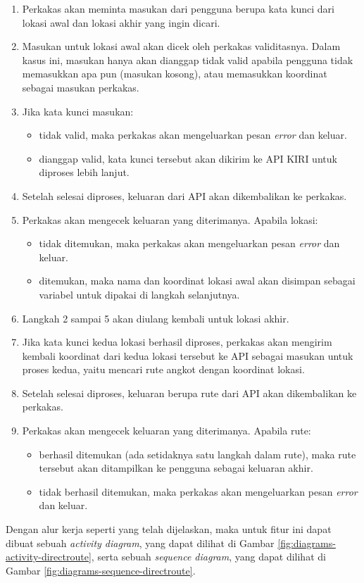 \begin{enumerate}
	\item Perkakas akan meminta masukan dari pengguna berupa kata kunci dari lokasi awal dan lokasi akhir yang ingin dicari.
	\item Masukan untuk lokasi awal akan dicek oleh perkakas validitasnya. Dalam kasus ini, masukan hanya akan dianggap tidak valid apabila pengguna tidak memasukkan apa pun (masukan kosong), atau memasukkan koordinat \latlon\xspace sebagai masukan perkakas.
	\item Jika kata kunci masukan:
	
	\begin{itemize}
		\item tidak valid, maka perkakas akan mengeluarkan pesan \textit{error} dan keluar.
		\item dianggap valid, kata kunci tersebut akan dikirim ke API KIRI untuk diproses lebih lanjut.
	\end{itemize}
	 
	\item Setelah selesai diproses, keluaran dari API akan dikembalikan ke perkakas.
	\item Perkakas akan mengecek keluaran yang diterimanya. Apabila lokasi:
	
	\begin{itemize}
		\item tidak ditemukan, maka perkakas akan mengeluarkan pesan \textit{error} dan keluar.
		\item ditemukan, maka nama dan koordinat \latlon\xspace lokasi awal akan disimpan sebagai variabel untuk dipakai di langkah selanjutnya.
	\end{itemize}
	
	\item Langkah 2 sampai 5 akan diulang kembali untuk lokasi akhir.
	\item Jika kata kunci kedua lokasi berhasil diproses, perkakas akan mengirim kembali koordinat \latlon\xspace dari kedua lokasi tersebut ke API sebagai masukan untuk proses kedua, yaitu mencari rute angkot dengan koordinat \latlon\xspace lokasi.
	\item Setelah selesai diproses, keluaran berupa rute dari API akan dikembalikan ke perkakas.
	\item Perkakas akan mengecek keluaran yang diterimanya. Apabila rute:
	
	\begin{itemize}
		\item berhasil ditemukan (ada setidaknya satu langkah dalam rute), maka rute tersebut akan ditampilkan ke pengguna sebagai keluaran akhir.
		\item tidak berhasil ditemukan, maka perkakas akan mengeluarkan pesan \textit{error} dan keluar.
	\end{itemize}
	
\end{enumerate}
\noindent
Dengan alur kerja seperti yang telah dijelaskan, maka untuk fitur ini dapat dibuat sebuah \textit{activity diagram}, yang dapat dilihat di Gambar \ref{fig:diagrams-activity-directroute}, serta sebuah \textit{sequence diagram}, yang dapat dilihat di Gambar \ref{fig:diagrams-sequence-directroute}.

